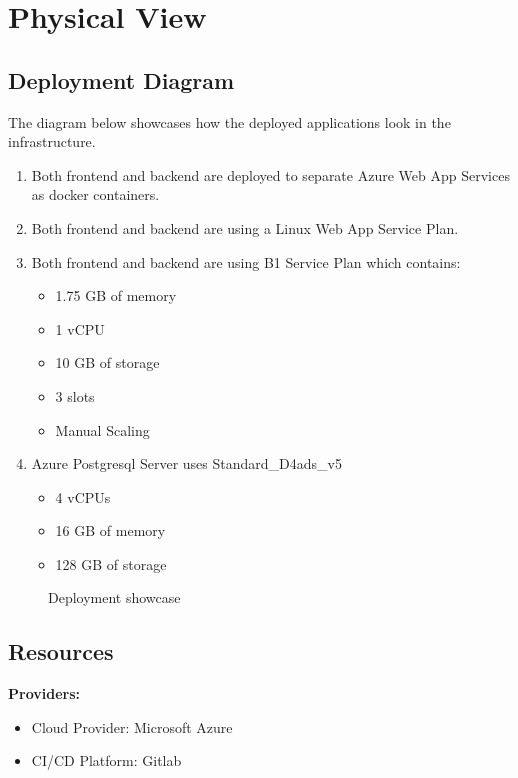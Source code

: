 \documentclass[
    english, %
]{VUMIFPSkursinis}
\begin{document}
\section{Physical View}

\subsection{Deployment Diagram}

The diagram below showcases how the deployed applications look in the infrastructure. 
\begin{enumerate}
    \item Both frontend and backend are deployed to separate Azure Web App Services as docker containers. 
    \item Both frontend and backend are using a Linux Web App Service Plan.
    \item Both frontend and backend are using B1 Service Plan which contains:
        \begin{itemize}
            \item 1.75 GB of memory
            \item 1 vCPU
            \item 10 GB of storage
            \item 3 slots
            \item Manual Scaling
        \end{itemize}
    \item Azure Postgresql Server uses Standard\_D4ads\_v5 
        \begin{itemize}
            \item 4 vCPUs
            \item 16 GB of memory
            \item 128 GB of storage
        \end{itemize}
\end{enumerate}

\begin{figure}[ht]
    \centering
    
    \label{deployment-showcase}
    \caption{Deployment showcase}
\end{figure}

\subsection{Resources}

\textbf{Providers:}
\begin{itemize}
    \item Cloud Provider: Microsoft Azure
    \item CI/CD Platform: Gitlab
\end{itemize}
\end{document}
